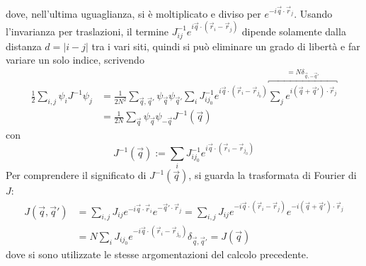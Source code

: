 \documentclass[11pt, a4paper]{scrartcl}
\theoremstyle{style}
\theoremstyle{style1}
\numberwithin{equation}{subsection}
\begin{document}
dove, nell'ultima uguaglianza, si \`e moltiplicato e diviso per $e^{-i\vec{q}\cdot \vec{r}_j}$. 
Usando l'invarianza per traslazioni, il termine $J_{ij}^{-1} e^{i \vec{q}\cdot (\vec{r}_i -\vec{r}_j)} $ dipende solamente dalla distanza $d = \lvert i - j \rvert $ tra i vari siti, quindi si pu\`o eliminare un grado di libert\`a e far variare un solo indice, scrivendo 
\[
	\begin{split}
		 \frac{1}{2} \sum_{i,j}^{} \psi _i J^{-1}\psi _j &= \frac{1}{2N^2} \sum_{\vec{q},\vec{q}'}^{} \psi _{\vec{q}} \psi _{\vec{q}'}  \sum_{i}^{} J^{-1}_{ij_0} e^{i \vec{q}\cdot (\vec{r}_i -\vec{r}_{j_0} )}\overbracket{\sum_{j}^{} e^{i(\vec{q}+\vec{q}') \cdot \vec{r}_j}}^{= N \delta _{\vec{q}, -\vec{q}'} } \\
			  &= \frac{1}{2N} \sum_{\vec{q}}^{} \psi _{\vec{q}}  \psi _{-\vec{q}}  J^{-1}(\vec{q})
	\end{split}
\] 
con 
\[
J^{-1}(\vec{q}) := \sum_{i}^{} J^{-1}_{ij_0} e^{i \vec{q}\cdot (\vec{r}_i -\vec{r}_{j_0} )}
\] 
Per comprendere il significato di $J^{-1}(\vec{q})$, si guarda la trasformata di Fourier di $J$:
\[
	\begin{split}
		J (\vec{q},\vec{q}') &= \sum_{i,j}^{} J_{ij} e^{-i  \vec{q}\cdot \vec{r}_i} e^{- \vec{q}' \cdot \vec{r}_j} = \sum_{i,j}^{} J_{ij} e^{-i \vec{q}\cdot (\vec{r}_i - \vec{r}_j)} e ^{-i (\vec{q} +\vec{q}') \cdot \vec{r}_j}\\
				     &= N\sum_{i}^{} J_{ij_0} e^{-i \vec{q}\cdot (\vec{r}_i -\vec{r}_{j_0} )} \delta _{\vec{q},\vec{q}'} = J(\vec{q})
	\end{split}
\] 
dove si sono utilizzate le stesse argomentazioni del calcolo precedente. 
\end{document}
